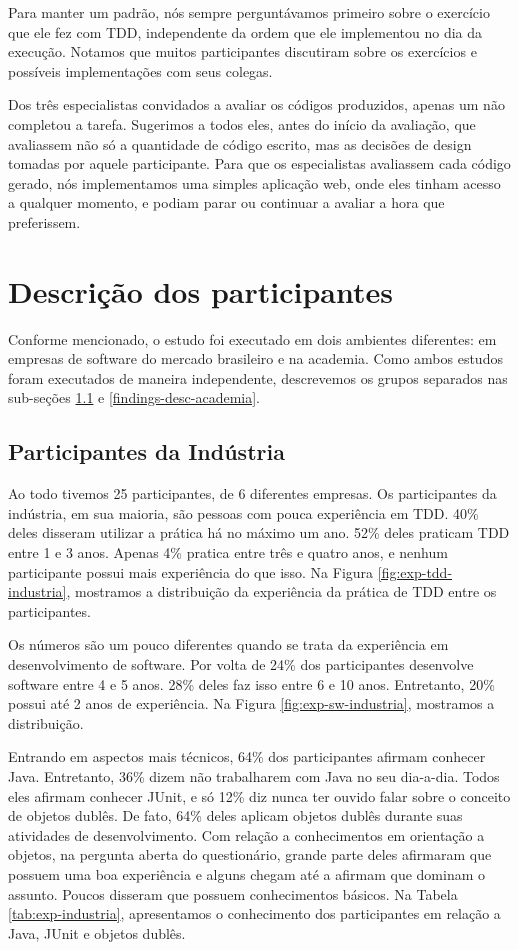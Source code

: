 Para manter um padrão, nós sempre perguntávamos primeiro sobre o exercício que ele
fez com TDD, independente da ordem que ele implementou no dia da execução. Notamos
que muitos participantes discutiram sobre os exercícios e possíveis implementações com seus colegas.

Dos três especialistas convidados a avaliar os códigos produzidos, apenas um não
completou a tarefa. Sugerimos a todos eles, antes do início da avaliação, que avaliassem
não só a quantidade de código escrito, mas as decisões de design tomadas por aquele
participante. Para que os especialistas avaliassem cada código gerado, nós implementamos
uma simples aplicação web, onde eles tinham acesso a qualquer momento, e podiam parar ou continuar
a avaliar a hora que preferissem.

\section{Descrição dos participantes}

Conforme mencionado, o estudo foi executado em dois ambientes diferentes: em empresas de software
do mercado brasileiro e na academia. Como ambos estudos foram executados de maneira independente,
descrevemos os grupos separados nas sub-seções \ref{findings-desc-industria} e \ref{findings-desc-academia}.

\subsection{Participantes da Indústria}
\label{findings-desc-industria}

Ao todo tivemos 25 participantes, de 6 diferentes empresas.
Os participantes da indústria, em sua maioria, são pessoas com pouca experiência em TDD.
40\% deles disseram utilizar a prática há no máximo um ano. 52\% deles praticam TDD
entre 1 e 3 anos. Apenas 4\% pratica entre três e quatro anos, e nenhum participante
possui mais experiência do que isso. Na Figura \ref{fig:exp-tdd-industria}, mostramos
a distribuição da experiência da prática de TDD entre os participantes.

Os números são um pouco diferentes quando se trata da experiência em desenvolvimento
de software. Por volta de 24\% dos participantes desenvolve software entre 4 e 5 anos.
28\% deles faz isso entre 6 e 10 anos. Entretanto, 20\% possui até 2 anos de experiência.
Na Figura \ref{fig:exp-sw-industria}, mostramos a distribuição.

Entrando em aspectos mais técnicos, 64\% dos participantes afirmam conhecer Java. Entretanto,
36\% dizem não trabalharem com Java no seu dia-a-dia. Todos eles afirmam conhecer JUnit,
e só 12\% diz nunca ter ouvido falar sobre o conceito de objetos dublês. De fato, 64\% deles
aplicam objetos dublês durante suas atividades de desenvolvimento. Com relação a conhecimentos
em orientação a objetos, na pergunta aberta do questionário, grande parte deles 
afirmaram que possuem uma boa experiência e alguns
chegam até a afirmam que dominam o assunto. Poucos disseram que possuem conhecimentos
básicos. Na Tabela \ref{tab:exp-industria},
apresentamos o conhecimento dos participantes em relação a Java, JUnit e objetos dublês.

